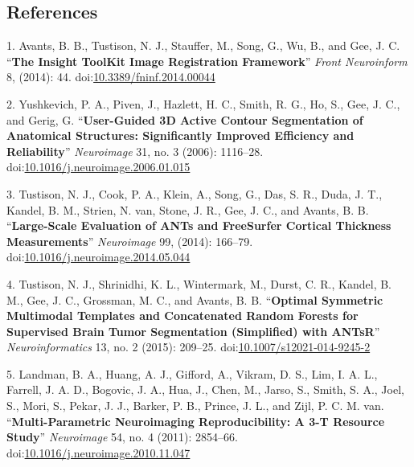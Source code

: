 \documentclass[12pt,]{article}
\begin{document}
\clearpage

\subsection*{References}\label{references}

\hypertarget{refs}{}
\hypertarget{ref-Avants:2014aa}{}
1. Avants, B. B., Tustison, N. J., Stauffer, M., Song, G., Wu, B., and
Gee, J. C. ``\textbf{The Insight ToolKit Image Registration Framework}''
\emph{Front Neuroinform} 8, (2014): 44.
doi:\href{https://doi.org/10.3389/fninf.2014.00044}{10.3389/fninf.2014.00044}

\hypertarget{ref-Yushkevich:2006aa}{}
2. Yushkevich, P. A., Piven, J., Hazlett, H. C., Smith, R. G., Ho, S.,
Gee, J. C., and Gerig, G. ``\textbf{User-Guided 3D Active Contour
Segmentation of Anatomical Structures: Significantly Improved Efficiency
and Reliability}'' \emph{Neuroimage} 31, no. 3 (2006): 1116--28.
doi:\href{https://doi.org/10.1016/j.neuroimage.2006.01.015}{10.1016/j.neuroimage.2006.01.015}

\hypertarget{ref-Tustison:2014ab}{}
3. Tustison, N. J., Cook, P. A., Klein, A., Song, G., Das, S. R., Duda,
J. T., Kandel, B. M., Strien, N. van, Stone, J. R., Gee, J. C., and
Avants, B. B. ``\textbf{Large-Scale Evaluation of ANTs and FreeSurfer
Cortical Thickness Measurements}'' \emph{Neuroimage} 99, (2014):
166--79.
doi:\href{https://doi.org/10.1016/j.neuroimage.2014.05.044}{10.1016/j.neuroimage.2014.05.044}

\hypertarget{ref-Tustison:2015aa}{}
4. Tustison, N. J., Shrinidhi, K. L., Wintermark, M., Durst, C. R.,
Kandel, B. M., Gee, J. C., Grossman, M. C., and Avants, B. B.
``\textbf{Optimal Symmetric Multimodal Templates and Concatenated Random
Forests for Supervised Brain Tumor Segmentation (Simplified) with
ANTsR}'' \emph{Neuroinformatics} 13, no. 2 (2015): 209--25.
doi:\href{https://doi.org/10.1007/s12021-014-9245-2}{10.1007/s12021-014-9245-2}

\hypertarget{ref-landman2011}{}
5. Landman, B. A., Huang, A. J., Gifford, A., Vikram, D. S., Lim, I. A.
L., Farrell, J. A. D., Bogovic, J. A., Hua, J., Chen, M., Jarso, S.,
Smith, S. A., Joel, S., Mori, S., Pekar, J. J., Barker, P. B., Prince,
J. L., and Zijl, P. C. M. van. ``\textbf{Multi-Parametric Neuroimaging
Reproducibility: A 3-T Resource Study}'' \emph{Neuroimage} 54, no. 4
(2011): 2854--66.
doi:\href{https://doi.org/10.1016/j.neuroimage.2010.11.047}{10.1016/j.neuroimage.2010.11.047}
\end{document}
